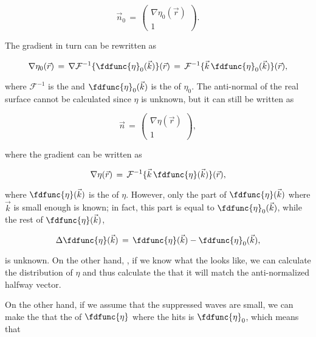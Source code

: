 \begin{equation}
\vec{n}_0 \,=\, \left(\!\!\!\begin{array}{c}\nabla\eta_0(\vec{r}) \\ 1\end{array}\!\!\!\right).
\end{equation}

The gradient in turn can be rewritten as

\begin{equation}
\nabla\eta_0(\vec{r}) \,=\, \nabla\mathcal{F}^{-1}\{\fdfunc{\eta}_0(\vec{k})\}(\vec{r}) \,=\, \mathcal{F}^{-1}\{\vec{k}\,\fdfunc{\eta}_0(\vec{k})\}(\vec{r}),
\end{equation}

where $\mathcal{F}^{-1}$ is the  and $\fdfunc{\eta}_0(\vec{k})$ is the  of $\eta_0$. The anti-normal of the real surface cannot be calculated since $\eta$ is unknown, but it can still be written as

\begin{equation}
\vec{n} \,=\, \left(\!\!\!\begin{array}{c}\nabla\eta(\vec{r}) \\ 1\end{array}\!\!\!\right),
\end{equation}

where the gradient can be written as

\begin{equation}
\nabla\eta(\vec{r}) \,=\, \mathcal{F}^{-1}\{\vec{k}\,\fdfunc{\eta}(\vec{k})\}(\vec{r}),
\end{equation}

where $\fdfunc{\eta}(\vec{k})$ is the  of $\eta$. However, only the part of $\fdfunc{\eta}(\vec{k})$ where $\vec{k}$ is small enough is known; in fact, this part is equal to $\fdfunc{\eta}_0(\vec{k})$, while the rest of $\fdfunc{\eta}(\vec{k})$,

\begin{equation}
\Delta\fdfunc{\eta}(\vec{k}) \,=\, \fdfunc{\eta}(\vec{k}) - \fdfunc{\eta}_0(\vec{k}),
\end{equation}

is unknown. On the other hand, , if we know what the  looks like, we can calculate the distribution of $\eta$ and thus calculate the  that it will match the anti-normalized halfway vector.

On the other hand, if we assume that the suppressed waves are small, we can make the \approximation that the  of $\fdfunc{\eta}$ where the  hits is $\fdfunc{\eta}_0$, which means that

